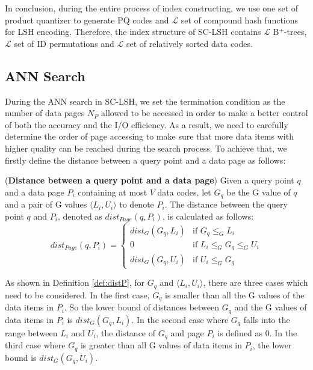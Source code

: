 \documentclass[twocolumn]{svjour3}          %
\begin{document}
In conclusion, during the entire process of index constructing, we use one set of product quantizer to generate PQ codes and $\mathcal{L}$ set of compound hash functions for LSH encoding. Therefore, the index structure of SC-LSH contains $\mathcal{L}$ B$^{+}$-trees, $\mathcal{L}$ set of ID permutations and $\mathcal{L}$ set of relatively sorted data codes.

\subsection{ANN Search}\label{subsec:annsearch}
During the ANN search in SC-LSH, we set the termination condition as the number of data pages $N_P$ allowed to be accessed in order to make a better control of both the accuracy and the I/O efficiency. As a result, we need to carefully determine the order of page accessing to make sure that more data items with higher quality can be reached during the search process. To achieve that, we firstly define the distance between a query point and a data page as follows:
\begin{definition}
\label{def:distP}
(\textbf{Distance between a query point and a data page}) Given a query point $q$ and a data page $P_i$ containing at most $V$ data codes, let $G_q$ be the G value of $q$ and a pair of G values $\langle L_i, U_i \rangle$ to denote $P_i$. The distance between the query point $q$ and $P_i$, denoted as $dist_{Page}(q,P_i)$, is calculated as follows:
\begin{equation}
\label{eq:distP}
dist_{Page}(q,P_i) = \left\{ \begin{array}{ll}
dist_G(G_q, L_i) & \textrm{if $G_q \leq_G L_i$} \\
0 & \textrm{if $L_i \leq_G G_q \leq_G U_i$} \\
dist_G(G_q, U_i) & \textrm{if $U_i \leq_G G_q$}
\end{array} \right.
\end{equation}
\end{definition}

As shown in Definition \ref{def:distP}, for $G_q$ and $\langle L_i,U_i\rangle$, there are three cases which need to be considered. In the first case, $G_q$ is smaller than all the G values of the data items in $P_i$. So the lower bound of distances between $G_q$ and the G values of data items in $P_i$ is $dist_G(G_q, L_i)$. In the second case where $G_q$ falls into the range between $L_i$ and $U_i$, the distance of $G_q$ and page $P_i$ is defined as 0. In the third case where $G_q$ is greater than all G values of data items in $P_i$, the lower bound is $dist_G(G_q, U_i)$.
\end{document}
